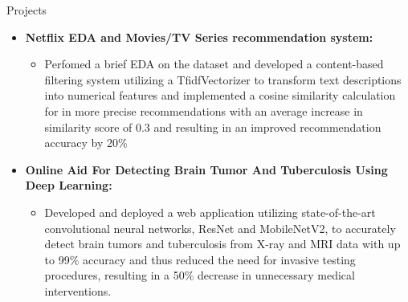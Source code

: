 \documentclass[]{mcdowellcv}
\begin{document}
\begin{cvsection}{Projects}
\begin{cvsubsection}{}{}{}
\begin{itemize}
                \item \textbf{Netflix EDA and Movies/TV Series recommendation system:}
				\begin{itemize}
					\item Perfomed a brief EDA on the dataset and developed a content-based filtering system utilizing a TfidfVectorizer to transform text descriptions into numerical features and implemented a cosine similarity calculation for in more precise recommendations with an average increase in similarity score of 0.3 and resulting in an improved recommendation accuracy by 20\%
				\end{itemize}
				
				\item \textbf{Online Aid For Detecting Brain Tumor And Tuberculosis Using Deep Learning:}
				\begin{itemize}
				    \item Developed and deployed a web application utilizing state-of-the-art convolutional neural networks, ResNet and MobileNetV2, to accurately detect brain tumors and tuberculosis from X-ray and MRI data with up to 99\% accuracy and thus reduced the need for invasive testing procedures, resulting in a 50\% decrease in unnecessary medical interventions.

				\end{itemize}
				
			\end{itemize}
		\end{cvsubsection}
	\end{cvsection}
\end{document}
